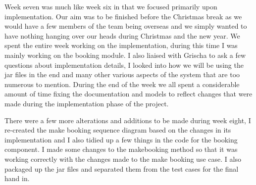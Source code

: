\documentclass{article}
\begin{document}
Week seven was much like week six in that we focused primarily upon implementation. Our aim was to be finished before the Christmas break as we would have a few members of the team being overseas and we simply wanted to have nothing hanging over our heads during Christmas and the new year. We spent the entire week working on the implementation, during this time I was mainly working on the booking module. I also liaised with Grischa to ask a few questions about implementation details, I looked into how we will be using the jar files in the end and many other various aspects of the system that are too numerous to mention. During the end of the week we all spent a considerable amount of time fixing the documentation and models to reflect changes that were made during the implementation phase of the project. 
\par

There were a few more alterations and additions to be made during week eight, I re-created the make booking sequence diagram based on the changes in its implementation and I also tidied up a few things in the code for the booking component. I made some changes to the makebooking method so that it was working correctly with the changes made to the make booking use case. I also packaged up the jar files and separated them from the test cases for the final hand in.
\end{document}

